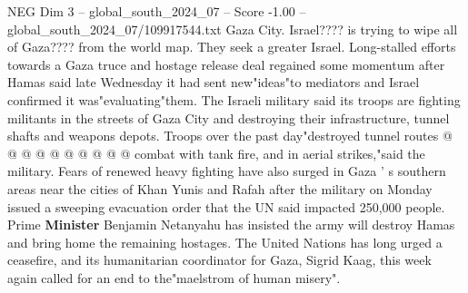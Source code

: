 \begin{textsample}{NEG Dim 3 – global\_south\_2024\_07 – Score -1.00 – global\_south\_2024\_07/109917544.txt}
Gaza City.
Israel???? is trying to wipe all of Gaza???? from the world map.
They seek a greater Israel.
Long-stalled efforts towards a Gaza truce and hostage release deal regained some momentum after Hamas said late Wednesday it had sent new"ideas"to mediators and Israel confirmed it was"evaluating"them.
The Israeli military said its troops are fighting militants in the streets of Gaza City and destroying their infrastructure, tunnel shafts and weapons depots.
Troops over the past day"destroyed tunnel routes @ @ @ @ @ @ @ @ @ @ combat with tank fire, and in aerial strikes,"said the military.
Fears of renewed heavy fighting have also surged in Gaza ' s southern areas near the cities of Khan Yunis and Rafah after the military on Monday issued a sweeping evacuation order that the UN said impacted 250,000 people.
Prime \textbf{Minister} Benjamin Netanyahu has insisted the army will destroy Hamas and bring home the remaining hostages.
The United Nations has long urged a ceasefire, and its humanitarian coordinator for Gaza, Sigrid Kaag, this week again called for an end to the"maelstrom of human misery".

\end{textsample}
